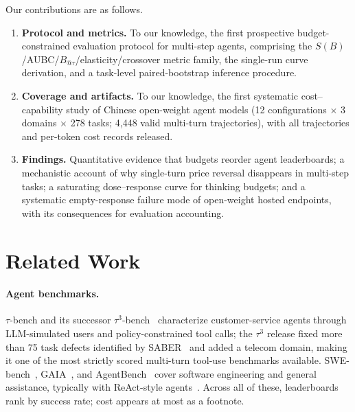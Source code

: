 \documentclass[preprint,authoryear,12pt]{elsarticle}
\begin{document}
Our contributions are as follows.
\begin{enumerate}
\item \textbf{Protocol and metrics.} To our knowledge, the first prospective budget-constrained evaluation protocol for multi-step agents, comprising the $S(B)$/AUBC/$B_{@\tau}$/elasticity/crossover metric family, the single-run curve derivation, and a task-level paired-bootstrap inference procedure.
\item \textbf{Coverage and artifacts.} To our knowledge, the first systematic cost--capability study of Chinese open-weight agent models (12 configurations $\times$ 3 domains $\times$ 278 tasks; 4,448 valid multi-turn trajectories), with all trajectories and per-token cost records released.
\item \textbf{Findings.} Quantitative evidence that budgets reorder agent leaderboards; a mechanistic account of why single-turn price reversal disappears in multi-step tasks; a saturating dose--response curve for thinking budgets; and a systematic empty-response failure mode of open-weight hosted endpoints, with its consequences for evaluation accounting.
\end{enumerate}

\section{Related Work}
\label{sec:related-work}
\paragraph{Agent benchmarks.} $\tau$-bench and its successor $\tau^3$-bench~\cite{barres2025tau2bench} characterize customer-service agents through LLM-simulated users and policy-constrained tool calls; the $\tau^3$ release fixed more than 75 task defects identified by SABER~\cite{cuadron2025saber} and added a telecom domain, making it one of the most strictly scored multi-turn tool-use benchmarks available. SWE-bench~\cite{jimenez2024swebench}, GAIA~\cite{mialon2023gaia}, and AgentBench~\cite{liu2024agentbench} cover software engineering and general assistance, typically with ReAct-style agents~\cite{yao2023react}. Across all of these, leaderboards rank by success rate; cost appears at most as a footnote.
\end{document}
